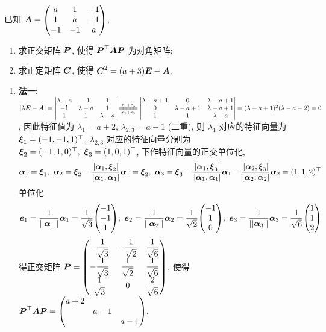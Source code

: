 \begin{example}[2019 数一]
    已知 $\vb*{A}=\mqty(a&1&-1\\1&a&-1\\-1&-1&a)$,
    \begin{enumerate}[label=(\arabic{*})]
        \item 求正交矩阵 $\vb*{P}$, 使得 $\vb*{P}^\top\vb*{AP}$ 为对角矩阵;
        \item 求正定矩阵 $\vb*{C}$, 使得 $\vb*{C}^2=(a+3)\vb*{E}-\vb*{A}.$
    \end{enumerate}
\end{example}
\begin{solution}
    \begin{enumerate}[label=(\arabic{*})]
        \item \textbf{法一: }$|\lambda\vb*{E}-\vb*{A}|=\mqty|\lambda-a&-1&1\\-1&\lambda-a&1\\1&1&\lambda-a|\xlongequal[r_2+r_3]{r_1+r_3}\mqty|\lambda-a+1&0&\lambda-a+1\\0&\lambda-a+1&\lambda-a+1\\1&1&\lambda-a|=(\lambda-a+1)^2(\lambda-a-2)=0$,
              因此特征值为 $\lambda_1=a+2$, $\lambda_{2,3}=a-1$ (二重), 则 $\lambda_1$ 对应的特征向量为 $\vb*{\xi}_1=(-1,-1,1)^\top$, $\lambda_{2,3}$ 对应的特征向量分别为 $\vb*{\xi}_2=(-1,1,0)^\top,~\vb*{\xi}_3=(1,0,1)^\top$, 下作特征向量的正交单位化,
              $$\vb*{\alpha}_1=\vb*{\xi}_1,~\vb*{\alpha}_2=\vb*{\xi}_2-\dfrac{\qty[\vb*{\alpha}_1,\vb*{\xi}_2]}{\qty[\vb*{\alpha}_1,\vb*{\alpha}_1]}\vb*{\alpha}_1=\vb*{\xi}_2,~\vb*{\alpha}_3=\vb*{\xi}_3-\dfrac{\qty[\vb*{\alpha}_1,\vb*{\xi}_3]}{\qty[\vb*{\alpha}_1,\vb*{\alpha}_1]}\vb*{\alpha}_1-\dfrac{\qty[\vb*{\alpha}_2,\vb*{\xi}_3]}{\qty[\vb*{\alpha}_2,\vb*{\alpha}_2]}\vb*{\alpha}_2=(1,1,2)^\top$$
              单位化 $$\vb*{e}_1=\dfrac{1}{||\vb*{\alpha}_1||}\vb*{\alpha}_1=\dfrac{1}{\sqrt{3}}\mqty(-1\\-1\\1),~\vb*{e}_2=\dfrac{1}{||\vb*{\alpha}_2||}\vb*{\alpha}_2=\dfrac{1}{\sqrt{2}}\mqty(-1\\1\\0),~\vb*{e}_3=\dfrac{1}{||\vb*{\alpha}_3||}\vb*{\alpha}_3=\dfrac{1}{\sqrt{6}}\mqty(1\\1\\2)$$
              得正交矩阵 $\vb*{P}=\mqty(-\dfrac{1}{\sqrt{3}}&-\dfrac{1}{\sqrt{2}}&\dfrac{1}{\sqrt{6}}\\[6pt]-\dfrac{1}{\sqrt{3}}&\dfrac{1}{\sqrt{2}}&\dfrac{1}{\sqrt{6}}\\[6pt]\dfrac{1}{\sqrt{3}}&0&\dfrac{2}{\sqrt{6}})$, 使得 $\vb*{P}^\top\vb*{AP}=\mqty(a+2\\&a-1\\&&a-1).$\\

\end{enumerate}
\end{solution}
